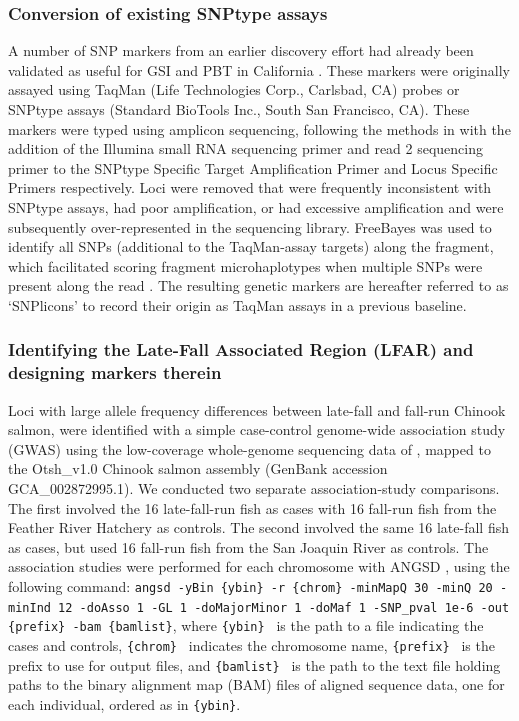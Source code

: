 \subsubsection*{Conversion of existing SNPtype assays}

A number of SNP markers from an earlier discovery effort \citep{clemento2011discovery} had already
been validated as useful for GSI
and PBT in California \citep{clemento2014evaluation}. These markers were originally assayed
using TaqMan (Life Technologies Corp., Carlsbad, CA) probes or SNPtype assays (Standard BioTools Inc., South San Francisco, CA).
These markers were typed using amplicon sequencing, following the methods in
\citet{campbell2015genotyping} with the addition of the Illumina small RNA sequencing primer and
read 2 sequencing primer to the SNPtype Specific Target Amplification Primer and Locus
Specific Primers respectively.  Loci were removed that were frequently inconsistent with SNPtype assays,
had poor amplification, or had excessive amplification and were subsequently over-represented in the sequencing library.  FreeBayes \citep{garrison2012haplotype} was used to identify all SNPs (additional to the TaqMan-assay targets) along the fragment, which facilitated scoring fragment microhaplotypes when multiple SNPs were present along the read \citep{baetscher2018microhaplotypes}. The resulting genetic markers are hereafter referred to as `SNPlicons' to record their origin as TaqMan assays in a previous
baseline.


\subsubsection*{Identifying the Late-Fall Associated Region (LFAR) and designing markers therein}

Loci with large allele frequency differences between late-fall and fall-run Chinook salmon,
were identified with a simple case-control genome-wide association study (GWAS) using the low-coverage whole-genome sequencing
data of \citet{thompson2020complex}, mapped to the Otsh\_v1.0 Chinook salmon assembly
(GenBank accession GCA\_002872995.1).  We conducted
two separate association-study comparisons.
The first involved the 16 late-fall-run fish as cases with 16 fall-run fish from the Feather River Hatchery as controls.
The second involved the same 16 late-fall fish as cases, but used 16 fall-run fish from the San
Joaquin River as controls.  The association studies were performed for each chromosome with
ANGSD \citep{pmid21663684,korneliussen_angsd_2014}, using the following command: {\footnotesize\tt angsd -yBin \{ybin\}  -r \{chrom\}
-minMapQ 30 -minQ 20 -minInd 12 -doAsso 1 -GL 1 -doMajorMinor 1 -doMaf 1 -SNP\_pval 1e-6
-out \{prefix\}  -bam \{bamlist\}}, where {\tt \{ybin\} } is the path to a file indicating the cases and
controls,
{\tt \{chrom\} } indicates the chromosome name, {\tt \{prefix\} } is the prefix to use for output files, and
{\tt \{bamlist\} } is the path to the text file holding paths to the binary alignment map (BAM) files
of aligned sequence data, one for each individual, ordered as in {\tt \{ybin\}}.

